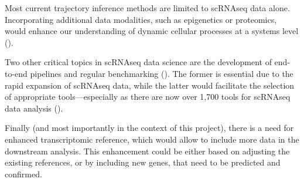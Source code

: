 Most current trajectory inference methods are limited to scRNAseq data alone.
Incorporating additional data modalities, such as epigenetics or proteomics,
would enhance our understanding of dynamic cellular processes at a systems level (\cite{Lahnemann2020}).

Two other critical topics in scRNAseq data science are the development of end-to-end pipelines and regular benchmarking (\cite{Heumos2023}).
The former is essential due to the rapid expansion of scRNAseq data, while the latter would facilitate
the selection of appropriate tools—especially as there are now over 1,700 tools for scRNAseq data analysis (\cite{scrnatools}).

Finally (and most importantly in the context of this project), there is a need for enhanced transcriptomic reference,
which would allow to include more data in the downstream analysis.
This enhancement could be either based on adjusting the existing references, or by including new genes,
that need to be predicted and confirmed.
\fi
